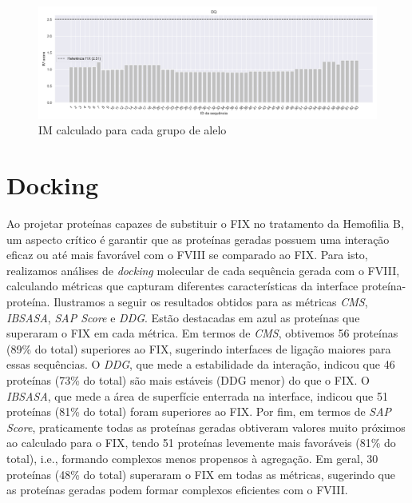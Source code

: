 \begin{figure}[H]
\begin{minipage}{0.9\textwidth}
    \end{minipage} \\[1ex]%
    \begin{minipage}{0.9\textwidth}
        \centering
        \includegraphics[width=\textwidth]{figuras/plot_imuno_IMscore_DQ.png}
    \end{minipage} 
    \caption{IM calculado para cada grupo de alelo}
\end{figure}


\section{Docking}       

Ao projetar proteínas capazes de substituir o FIX no tratamento da Hemofilia B, um aspecto crítico é garantir que as 
proteínas geradas possuem uma interação eficaz ou até mais favorável com o FVIII se comparado ao FIX.
Para isto, realizamos análises de \textit{docking} molecular de cada sequência gerada com o FVIII,
calculando métricas que capturam diferentes características da interface proteína-proteína. 
Ilustramos a seguir os resultados obtidos para as métricas \textit{CMS}, \textit{IBSASA}, \textit{SAP Score} e \textit{DDG}.
Estão destacadas em azul as proteínas que superaram o FIX em cada métrica.
Em termos de \textit{CMS}, obtivemos 56 proteínas (89\% do total) superiores ao FIX, 
sugerindo interfaces de ligação maiores para essas sequências.
O \textit{DDG}, que mede a estabilidade da interação, indicou que 46 proteínas (73\% do total) 
são mais estáveis (DDG menor) do que o FIX.
O \textit{IBSASA}, que mede a área de superfície enterrada na interface, indicou que 51 proteínas (81\% do total)
foram superiores ao FIX.
Por fim, em termos de \textit{SAP Score}, praticamente todas as proteínas geradas obtiveram valores muito próximos ao 
calculado para o FIX, tendo 51 proteínas levemente mais favoráveis (81\% do total), i.e., formando complexos menos propensos à agregação.
Em geral, 30 proteínas (48\% do total) superaram o FIX em todas as métricas,
sugerindo que as proteínas geradas podem formar complexos eficientes com o FVIII.

